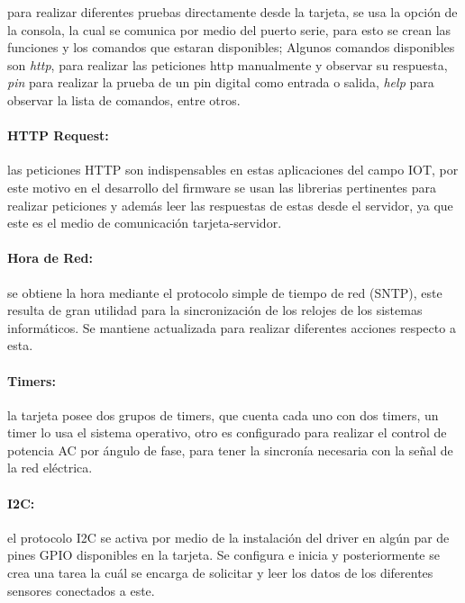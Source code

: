 para realizar diferentes pruebas directamente desde la tarjeta, se usa la opción de la consola, la cual se comunica por medio del puerto serie, para esto se crean las funciones y los comandos que estaran disponibles; Algunos comandos disponibles son \textit{http}, para realizar las peticiones http manualmente y observar su respuesta, \textit{pin} para realizar la prueba de un pin digital como entrada o salida, \textit{help} para observar la lista de comandos, entre otros.

\paragraph{HTTP Request:}

las peticiones HTTP son indispensables en estas aplicaciones del campo IOT, por este motivo en el desarrollo del firmware se usan las librerias pertinentes para realizar peticiones y además leer las respuestas de estas desde el servidor, ya que este es el medio de comunicación tarjeta-servidor.

\paragraph{Hora de Red:}

se obtiene la hora mediante el protocolo simple de tiempo de red (SNTP), este resulta de gran utilidad para la sincronización de los relojes de los sistemas informáticos. Se mantiene actualizada para realizar diferentes acciones respecto a esta.

\paragraph{Timers:}

la tarjeta posee dos grupos de timers, que cuenta cada uno con dos timers, un timer lo usa el sistema operativo, otro es configurado para realizar el control de potencia AC por ángulo de fase, para tener la sincronía necesaria con la señal de la red eléctrica.

\paragraph{I2C:}

el protocolo I2C se activa por medio de la instalación del driver en algún par de pines GPIO disponibles en la tarjeta. Se configura e inicia y posteriormente se crea una tarea la cuál se encarga de solicitar y leer los datos de los diferentes sensores conectados a este.

